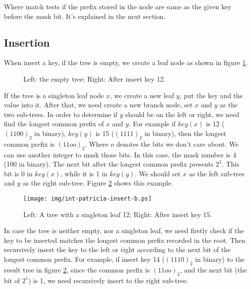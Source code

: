 \documentclass[b5paper]{article}
\begin{document}
Where match tests if the prefix stored in the node are same as the given key
before the mask bit. It's explained in the next section.

\subsection{Insertion}
When insert a key, if the tree is empty, we create a leaf node as shown in figure
\ref{fig:int-patricia-insert-a}.

\begin{figure}[htbp]
  \centering
  \caption{Left: the empty tree; Right: After insert key 12.}
  \label{fig:int-patricia-insert-a}
\end{figure}

If the tree is a singleton leaf node $x$, we create a new leaf $y$,
put the key and the value into it. After that, we need create a new branch
node, set $x$ and $y$ as the two sub-trees.
In order to determine if $y$ should be on the left or right, we need
find the longest common prefix of $x$ and $y$. For example if $key(x)$
is 12 ($(1100)_2$ in binary), $key(y)$ is 15 ($(1111)_2$ in binary), then the longest
common prefix is $(11oo)_2$. Where $o$ denotes the bits we don't care about.
We can use another integer to mask those bits.
In this case, the mask number is 4 (100 in binary).
The next bit after the longest common prefix presents $2^1$. This bit is
0 in $key(x)$, while it is 1 in $key(y)$. We should set $x$ as the left
sub-tree and $y$ as the right sub-tree. Figure \ref{fig:int-patricia-insert-b}
shows this example.

\begin{figure}[htbp]
  \centering
  \texttt{[image: img/int-patricia-insert-b.ps]}
  \caption{Left: A tree with a singleton leaf 12; Right: After insert key 15.}
  \label{fig:int-patricia-insert-b}
\end{figure}

In case the tree is neither empty, nor a singleton leaf, we need
firstly check if the key to be inserted matches the longest common
prefix recorded in the root.
Then recursively insert the key to the left or right
according to the next bit of the longest common prefix.
For example, if insert key 14 ($(1110)_2$ in binary) to the result tree
in figure \ref{fig:int-patricia-insert-b}, since the common prefix is
$(11oo)_2$, and the next bit (the bit of $2^1$) is 1, we need recursively
insert to the right sub-tree.
\end{document}
